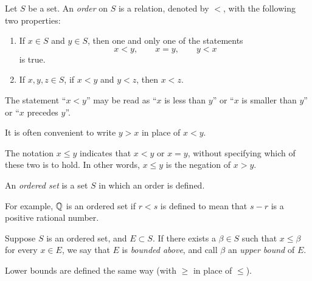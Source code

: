 \documentclass[11pt,twoside]{article}
\begin{document}
Let $S$ be a set. An \emph{order} on $S$ is a relation, denoted by $<$, with the
following two properties:
\begin{enumerate}[label=(\roman*), leftmargin=2.2em, itemsep=2pt, topsep=4pt]
  \item If $x \in S$ and $y \in S$, then one and only one of the statements
        \[ x < y, \qquad x = y, \qquad y < x \]
        is true.
  \item If $x, y, z \in S$, if $x < y$ and $y < z$, then $x < z$.
\end{enumerate}
The statement ``$x < y$'' may be read as ``$x$ is less than $y$'' or ``$x$ is
smaller than $y$'' or ``$x$ precedes $y$''.

It is often convenient to write $y > x$ in place of $x < y$.

The notation $x \le y$ indicates that $x < y$ or $x = y$, without specifying
which of these two is to hold. In other words, $x \le y$ is the negation of
$x > y$.

An \emph{ordered set} is a set $S$ in which an order is defined.

For example, $\mathbb{Q}$ is an ordered set if $r < s$ is defined to mean that $s - r$
is a positive rational number.

Suppose $S$ is an ordered set, and $E \subset S$. If there exists a
$\beta \in S$ such that $x \le \beta$ for every $x \in E$, we say that $E$ is
\emph{bounded above}, and call $\beta$ an \emph{upper bound} of $E$.

Lower bounds are defined the same way (with $\ge$ in place of $\le$).
\end{document}
